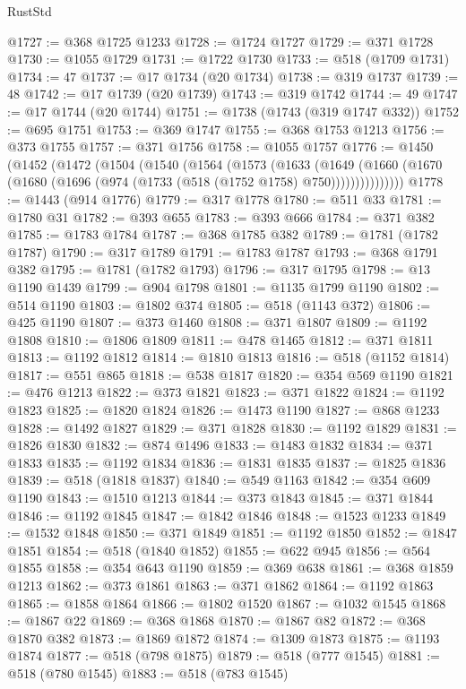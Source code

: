 \begin{lexlean}{RustStd}
\begin{coremodule}
@1727 := @368 @1725 @1233
@1728 := @1724 @1727
@1729 := @371 @1728
@1730 := @1055 @1729
@1731 := @1722 @1730
@1733 := @518 (@1709 @1731)
@1734 := 47
@1737 := @17 @1734 (@20 @1734)
@1738 := @319 @1737
@1739 := 48
@1742 := @17 @1739 (@20 @1739)
@1743 := @319 @1742
@1744 := 49
@1747 := @17 @1744 (@20 @1744)
@1751 := @1738 (@1743 (@319 @1747 @332))
@1752 := @695 @1751
@1753 := @369 @1747
@1755 := @368 @1753 @1213
@1756 := @373 @1755
@1757 := @371 @1756
@1758 := @1055 @1757
@1776 := @1450
    (@1452
      (@1472
        (@1504
          (@1540
            (@1564
              (@1573
                (@1633
                  (@1649
                    (@1660 (@1670 (@1680 (@1696 (@974 (@1733 (@518 (@1752 @1758) @750)))))))))))))))
@1778 := @1443 (@914 @1776)
@1779 := @317 @1778
@1780 := @511 @33
@1781 := @1780 @31
@1782 := @393 @655
@1783 := @393 @666
@1784 := @371 @382
@1785 := @1783 @1784
@1787 := @368 @1785 @382
@1789 := @1781 (@1782 @1787)
@1790 := @317 @1789
@1791 := @1783 @1787
@1793 := @368 @1791 @382
@1795 := @1781 (@1782 @1793)
@1796 := @317 @1795
@1798 := @13 @1190 @1439
@1799 := @904 @1798
@1801 := @1135 @1799 @1190
@1802 := @514 @1190
@1803 := @1802 @374
@1805 := @518 (@1143 @372)
@1806 := @425 @1190
@1807 := @373 @1460
@1808 := @371 @1807
@1809 := @1192 @1808
@1810 := @1806 @1809
@1811 := @478 @1465
@1812 := @371 @1811
@1813 := @1192 @1812
@1814 := @1810 @1813
@1816 := @518 (@1152 @1814)
@1817 := @551 @865
@1818 := @538 @1817
@1820 := @354 @569 @1190
@1821 := @476 @1213
@1822 := @373 @1821
@1823 := @371 @1822
@1824 := @1192 @1823
@1825 := @1820 @1824
@1826 := @1473 @1190
@1827 := @868 @1233
@1828 := @1492 @1827
@1829 := @371 @1828
@1830 := @1192 @1829
@1831 := @1826 @1830
@1832 := @874 @1496
@1833 := @1483 @1832
@1834 := @371 @1833
@1835 := @1192 @1834
@1836 := @1831 @1835
@1837 := @1825 @1836
@1839 := @518 (@1818 @1837)
@1840 := @549 @1163
@1842 := @354 @609 @1190
@1843 := @1510 @1213
@1844 := @373 @1843
@1845 := @371 @1844
@1846 := @1192 @1845
@1847 := @1842 @1846
@1848 := @1523 @1233
@1849 := @1532 @1848
@1850 := @371 @1849
@1851 := @1192 @1850
@1852 := @1847 @1851
@1854 := @518 (@1840 @1852)
@1855 := @622 @945
@1856 := @564 @1855
@1858 := @354 @643 @1190
@1859 := @369 @638
@1861 := @368 @1859 @1213
@1862 := @373 @1861
@1863 := @371 @1862
@1864 := @1192 @1863
@1865 := @1858 @1864
@1866 := @1802 @1520
@1867 := @1032 @1545
@1868 := @1867 @22
@1869 := @368 @1868
@1870 := @1867 @82
@1872 := @368 @1870 @382
@1873 := @1869 @1872
@1874 := @1309 @1873
@1875 := @1193 @1874
@1877 := @518 (@798 @1875)
@1879 := @518 (@777 @1545)
@1881 := @518 (@780 @1545)
@1883 := @518 (@783 @1545)

\end{coremodule}
\end{lexlean}
